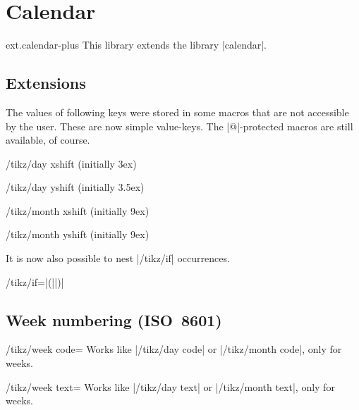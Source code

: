 %
%
%

\section{Calendar}
\begin{tikzlibrary}{ext.calendar-plus}
  This library extends the \tikzname\space library |calendar|.
\end{tikzlibrary}

\subsection{Extensions}

The values of following keys were stored in some macros that are not
accessible by the user. These are now simple value-keys.
The |@|-protected macros are still available, of course.

\begin{key}{/tikz/day xshift (initially 3ex)}
\end{key}
\begin{key}{/tikz/day yshift (initially 3.5ex)}
\end{key}
\begin{key}{/tikz/month xshift (initially 9ex)}
\end{key}
\begin{key}{/tikz/month yshift (initially 9ex)}
\end{key}

It is now also possible to nest |/tikz/if| occurrences.
\begin{key}{/tikz/if=|(||)|}
\end{key}

\subsection{Week numbering (ISO~8601)}

\begin{key}{/tikz/week code=}
  Works like |/tikz/day code| or |/tikz/month code|, only for weeks.
\end{key}

\begin{key}{/tikz/week text=}
  Works like |/tikz/day text| or |/tikz/month text|, only for weeks.
\end{key}

